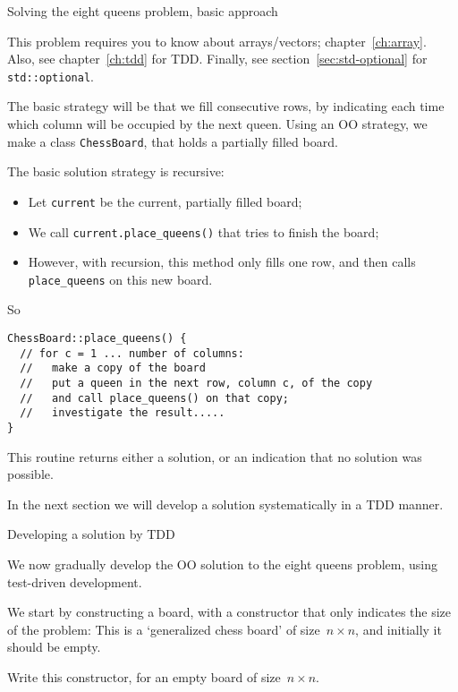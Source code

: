  {Solving the eight queens problem, basic approach}
\label{sec:8queens-strategy}

This problem requires you to know about arrays/vectors;
chapter~\ref{ch:array}.
Also, see chapter~\ref{ch:tdd} for \ac{TDD}.
Finally, see section~\ref{sec:std-optional} for \lstinline+std::optional+.

The basic strategy will be that we fill consecutive rows,
by indicating each time which column will be occupied by the next queen.
Using an \ac{OO} strategy, we make a class \lstinline{ChessBoard},
that holds a partially filled board.

The basic solution strategy is recursive:
\begin{itemize}
\item Let \lstinline{current} be the current, partially filled board;
\item We call \lstinline{current.place_queens()} that tries to finish the board;
\item However, with recursion, this method only fills one row,
  and then calls \lstinline+place_queens+ on this new board.
\end{itemize}
So
\begin{lstlisting}
ChessBoard::place_queens() {
  // for c = 1 ... number of columns:
  //   make a copy of the board
  //   put a queen in the next row, column c, of the copy
  //   and call place_queens() on that copy;
  //   investigate the result.....
}
\end{lstlisting}
This routine returns either a solution, or an indication that no solution was possible.

In the next section we will develop a solution
systematically in a \ac{TDD} manner.

 {Developing a solution by TDD}
\label{sec:8queens-tdd}

We now gradually develop the \ac{OO} solution to the eight queens problem,
using test-driven development.


We start by constructing a board,
with a constructor that only indicates the size of the problem:
This is a `generalized chess board' of size~$n\times n$,
and initially it should be empty.

\begin{exercise}
  Write this constructor, for an empty board of size~$n\times n$.
\end{exercise}


